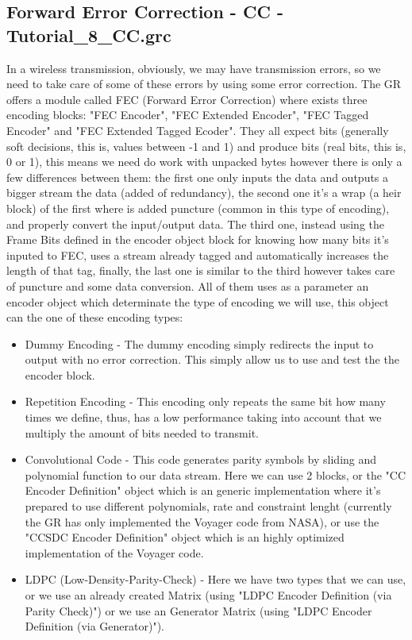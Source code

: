 \documentclass[a4paper, 10pt, conference]{ieeeconf}      %
\begin{document}
\subsection{Forward Error Correction - CC - Tutorial\_8\_CC.grc}
    In a wireless transmission, obviously, we may have transmission errors, so we need to take care of some of these errors by using some error correction. The GR offers a module called FEC (Forward Error Correction) where exists three encoding blocks: "FEC Encoder", "FEC Extended Encoder", "FEC Tagged Encoder" and "FEC Extended Tagged Ecoder". They all expect bits (generally soft decisions, this is, values between -1 and 1) and produce bits (real bits, this is, 0 or 1), this means we need do work with unpacked bytes however there is only a few differences between them: the first one only inputs the data and outputs a bigger stream the data (added of redundancy), the second one it's a wrap (a heir block) of the first where is added puncture (common in this type of encoding), and properly convert the input/output data. The third one, instead using the Frame Bits defined in the encoder object block for knowing how many bits it's inputed to FEC, uses a stream already tagged and automatically increases the length of that tag, finally, the last one is similar to the third however takes care of puncture and some data conversion. All of them uses as a parameter an encoder object which determinate the type of encoding we will use, this object can the one of these encoding types:
    \begin{itemize}
        \item Dummy Encoding - The dummy encoding simply redirects the input to output with no error correction. This simply allow us to use and test the the encoder block.
        \item Repetition Encoding - This encoding only repeats the same bit how many times we define, thus, has a low performance taking into account that we multiply the amount of bits needed to transmit.
        \item Convolutional Code - This code generates parity symbols by sliding and polynomial function to our data stream. Here we can use 2 blocks, or the "CC Encoder Definition" object which is an generic implementation where it's prepared to use different polynomials, rate and constraint lenght (currently the GR has only implemented the Voyager code from NASA), or use the "CCSDC Encoder Definition" object which is an highly optimized implementation of the Voyager code.
        \item LDPC (Low-Density-Parity-Check) - Here we have two types that we can use, or we use an already created Matrix (using "LDPC Encoder Definition (via Parity Check)") or we use an Generator Matrix (using "LDPC Encoder Definition (via Generator)").
    \end{itemize}
    
\end{document}
